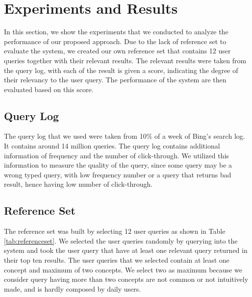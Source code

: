 \section{Experiments and Results}
In this section, we show the experiments that we conducted 
to analyze the performance of our proposed approach. Due to 
the lack of reference set to evaluate the system, we created 
our own reference set that contains 12 user queries together 
with their relevant results. The relevant results were taken 
from the query log, with each of the result is given a score, 
indicating the degree of their relevancy to the user query. 
The performance of the system are then evaluated based on this 
score.

\subsection{Query Log}
The query log that we used were taken from 10\% of a week of 
Bing's search log. It contains around 14 million queries. The 
query log contains additional information of frequency and the 
number of click-through. We utilized this information to measure 
the quality of the query, since some query may be a wrong typed 
query, with low frequency number or a query that returns bad 
result, hence having low number of click-through.

\subsection{Reference Set}
The reference set was built by selecting 12 user queries as shown 
in Table \ref{tab:referenceset}. We selected the user queries 
randomly by querying into the system and took the user query that 
have at least one relevant query returned in their top ten results. 
The user queries that we selected contain at least one concept and 
maximum of two concepts. We select two as maximum because we consider 
query having more than two concepts are not common or not intuitively 
made, and is hardly composed by daily users.

